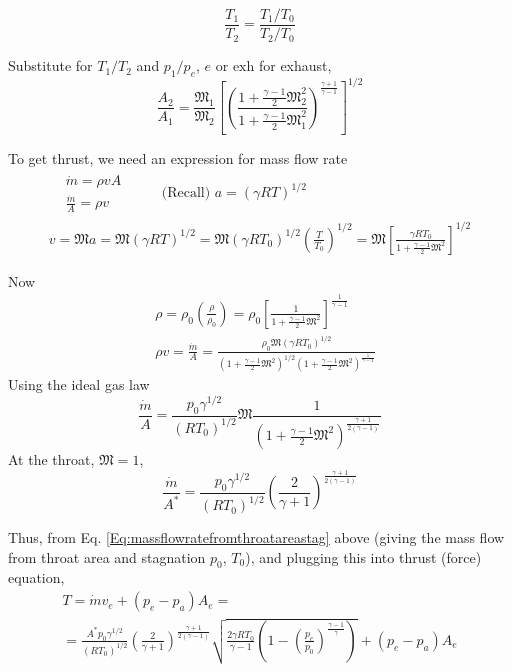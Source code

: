 \documentclass[10pt]{amsart}
\begin{document}
\begin{multicols*}{2}
\[
\frac{T_1}{T_2} = \frac{T_1 /T_0 }{ T_2/T_0 }
\]

Substitute for $T_1/T_2 $ and $p_1/p_e$, $e$ or $\text{exh}$ for exhaust,
\begin{equation}\label{Eq:AreastoMachs}
\frac{A_2}{A_1} = \frac{ \mathfrak{M}_1}{\mathfrak{M}_2} \left[ \left( \frac{ 1 + \frac{\gamma-1}{2} \mathfrak{M}_2^2 }{ 1 + \frac{\gamma-1}{2} \mathfrak{M}_1^2 } \right)^{\frac{ \gamma+1}{\gamma -1} } \right]^{1/2}
\end{equation}




To get thrust, we need an expression for mass flow rate
\[
\begin{gathered}
  \begin{aligned}
    & \dot{m} = \rho v A \\ 
    & \frac{\dot{m}}{A} = \rho v
  \end{aligned} \quad \quad \, \text{ (Recall) } a = (\gamma R T)^{1/2}  \\
  v = \mathfrak{M}a = \mathfrak{M} (\gamma RT)^{1/2} = \mathfrak{M} (\gamma RT_0)^{1/2} \left( \frac{T}{T_0} \right)^{1/2} = \mathfrak{M} \left[ \frac{ \gamma RT_0}{ 1 + \frac{ \gamma - 1 }{2} \mathfrak{M}^2 } \right]^{1/2}
\end{gathered}
\]

Now
\[
\begin{aligned}
  & \rho = \rho_0 \left( \frac{ \rho}{\rho_0 } \right) = \rho_0 \left[ \frac{1}{ 1 + \frac{\gamma - 1 }{2} \mathfrak{M}^2  } \right]^{\frac{1}{\gamma -1 } }  \\
  & \rho v = \frac{\dot{m}}{A} = \frac{ \rho_0 \mathfrak{M} (\gamma RT_0)^{1/2}}{ \left( 1 + \frac{ \gamma -1 }{2} \mathfrak{M}^2 \right)^{1/2} \left( 1 + \frac{ \gamma -1 }{2} \mathfrak{M}^2 \right)^{ \frac{1}{\gamma -1 } } }
\end{aligned}
\]
Using the ideal gas law
\[
\frac{\dot{m}}{A} = \frac{ p_0 \gamma^{1/2} }{ (RT_0)^{1/2} } \mathfrak{M} \frac{1}{ \left( 1 + \frac{ \gamma -1}{2} \mathfrak{M}^2 \right)^{\frac{\gamma + 1}{ 2(\gamma -1 ) } } }
\]
At the throat, $\mathfrak{M} =1$,
\begin{equation}\label{Eq:massflowratefromthroatareastag}
\frac{\dot{m}}{ A^*} = \frac{p_0 \gamma^{1/2} }{ (RT_0)^{1/2} } \left( \frac{2}{\gamma +1 } \right)^{ \frac{\gamma +1 }{ 2(\gamma -1 ) } }
\end{equation}

Thus, from Eq. \ref{Eq:massflowratefromthroatareastag} above (giving the mass flow from throat area and stagnation $p_0$, $T_0$), and plugging this into thrust (force) equation, 
\begin{equation}\label{Eq:thrustfromnozzle}
\begin{gathered}
  T = \dot{m}v_e + (p_e - p_a)A_e = \\ 
  = \frac{A^*p_0 \gamma^{1/2} }{ (RT_0)^{1/2} } \left( \frac{2}{\gamma +1 } \right)^{ \frac{\gamma +1 }{ 2(\gamma -1 ) } } \sqrt{ \frac{2\gamma RT_0}{\gamma -1} \left(1- \left( \frac{p_e}{p_0} \right)^{\frac{\gamma-1}{\gamma} } \right) } + (p_e-p_a)A_e
\end{gathered}
\end{equation}


\end{multicols*}
\end{document}
